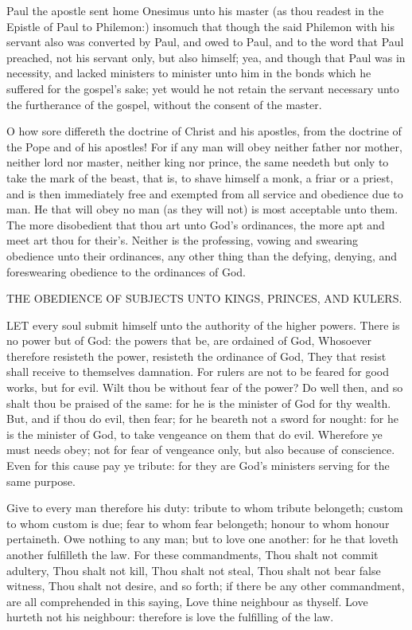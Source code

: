 Paul the apostle sent home Onesimus unto his master 
(as thou readest in the Epistle of Paul to Philemon:) 
insomuch that though the said Philemon with his servant 
also was converted by Paul, and owed to Paul, and 
to the word that Paul preached, not his servant only, but 
also himself; yea, and though that Paul was in necessity, 
and lacked ministers to minister unto him in the bonds 
which he suffered for the gospel's sake; yet would he not 
retain the servant necessary unto the furtherance of the 
gospel, without the consent of the master.

O how sore differeth the doctrine of Christ and his 
apostles, from the doctrine of the Pope and of his apostles!
For if any man will obey neither father nor 
mother, neither lord nor master, neither king nor prince, 
the same needeth but only to take the mark of the beast, 
that is, to shave himself a monk, a friar or a priest, and is 
then immediately free and exempted from all service and 
obedience due to man. He that will obey no man (as 
they will not) is most acceptable unto them. The more 
disobedient that thou art unto God's ordinances, the more 
apt and meet art thou for their's. Neither is the professing, 
vowing and swearing obedience unto their ordinances, any 
other thing than the defying, denying, and foreswearing 
obedience to the ordinances of God.


THE OBEDIENCE OF SUBJECTS UNTO KINGS, 
PRINCES, AND KULERS. 

LET every soul submit himself unto the authority of 
the higher powers. There is no power but of 
God: the powers that be, are ordained of God, Whosoever
therefore resisteth the power, resisteth the ordinance
of God, They that resist shall receive to themselves
damnation. For rulers are not to be feared for 
good works, but for evil. Wilt thou be without fear of 
the power? Do well then, and so shalt thou be praised 
of the same: for he is the minister of God for thy
wealth. But, and if thou do evil, then fear; for he 
beareth not a sword for nought: for he is the minister 
of God, to take vengeance on them that do evil. Wherefore
ye must needs obey; not for fear of vengeance only, 
but also because of conscience. Even for this cause pay 
ye tribute: for they are God's ministers serving for the 
same purpose. 

Give to every man therefore his duty: tribute to whom 
tribute belongeth; custom to whom custom is due; fear 
to whom fear belongeth; honour to whom honour pertaineth. 
Owe nothing to any man; but to love one another: for 
he that loveth another fulfilleth the law. For these commandments,
Thou shalt not commit adultery, Thou shalt 
not kill, Thou shalt not steal, Thou shalt not bear false witness,
Thou shalt not desire, and so forth; if there be any other 
commandment, are all comprehended in this saying, Love 
thine neighbour as thyself. Love hurteth not his neighbour:
therefore is love the fulfilling of the law. 

